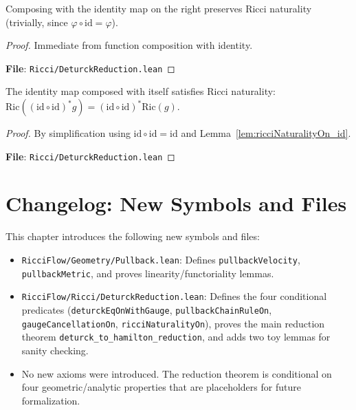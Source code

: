 \begin{lemma}
\label{lem:ricciNaturalityOn_comp_id}
\leanok
{}
Composing with the identity map on the right preserves Ricci naturality (trivially, since $\varphi \circ \mathrm{id} = \varphi$).
\end{lemma}

\begin{proof}
\leanok
Immediate from function composition with identity.

\textbf{File}: \texttt{Ricci/DeturckReduction.lean}
\end{proof}

\begin{lemma}
\label{lem:ricciNaturalityOn_id_id}
\leanok
{}
The identity map composed with itself satisfies Ricci naturality: $\mathrm{Ric}((\mathrm{id} \circ \mathrm{id})^* g) = (\mathrm{id} \circ \mathrm{id})^* \mathrm{Ric}(g)$.
\end{lemma}

\begin{proof}
\leanok
By simplification using $\mathrm{id} \circ \mathrm{id} = \mathrm{id}$ and Lemma~\ref{lem:ricciNaturalityOn_id}.

\textbf{File}: \texttt{Ricci/DeturckReduction.lean}
\end{proof}

\section{Changelog: New Symbols and Files}

This chapter introduces the following new symbols and files:
\begin{itemize}
\item \texttt{RicciFlow/Geometry/Pullback.lean}: Defines \texttt{pullbackVelocity}, \texttt{pullbackMetric}, and proves linearity/functoriality lemmas.
\item \texttt{RicciFlow/Ricci/DeturckReduction.lean}: Defines the four conditional predicates (\texttt{deturckEqOnWithGauge}, \texttt{pullbackChainRuleOn}, \texttt{gaugeCancellationOn}, \texttt{ricciNaturalityOn}), proves the main reduction theorem \texttt{deturck\_to\_hamilton\_reduction}, and adds two toy lemmas for sanity checking.
\item No new axioms were introduced. The reduction theorem is conditional on four geometric/analytic properties that are placeholders for future formalization.
\end{itemize}

